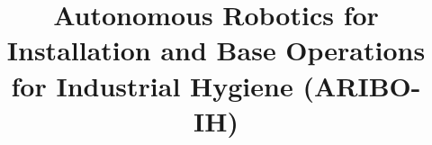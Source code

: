 \title{\LARGE \bf
Autonomous Robotics for Installation and Base Operations \\for Industrial Hygiene (ARIBO-IH)}
